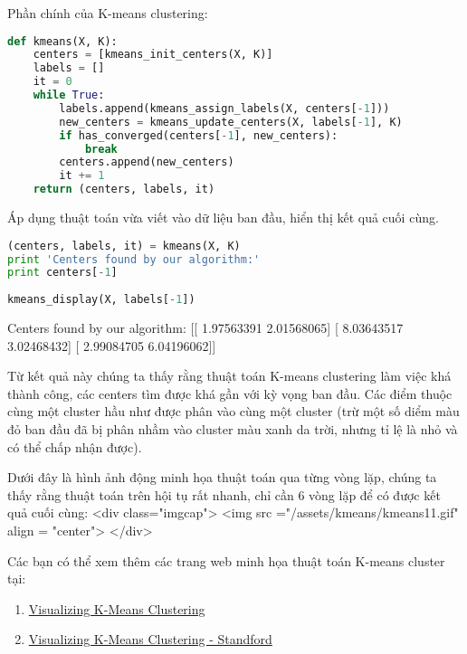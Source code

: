 Phần chính của K-means clustering: 
 
 
\begin{lstlisting}[language=Python]
def kmeans(X, K): 
    centers = [kmeans_init_centers(X, K)] 
    labels = [] 
    it = 0  
    while True: 
        labels.append(kmeans_assign_labels(X, centers[-1])) 
        new_centers = kmeans_update_centers(X, labels[-1], K) 
        if has_converged(centers[-1], new_centers): 
            break 
        centers.append(new_centers) 
        it += 1 
    return (centers, labels, it) 
\end{lstlisting}
 
Áp dụng thuật toán vừa viết vào dữ liệu ban đầu, hiển thị kết quả cuối cùng.  
 
 
\begin{lstlisting}[language=Python]
(centers, labels, it) = kmeans(X, K) 
print 'Centers found by our algorithm:' 
print centers[-1] 
 
kmeans_display(X, labels[-1]) 
\end{lstlisting}
 
    Centers found by our algorithm: 
    [[ 1.97563391  2.01568065] 
     [ 8.03643517  3.02468432] 
     [ 2.99084705  6.04196062]] 
 
 
 
 
Từ kết quả này chúng ta thấy rằng thuật toán K-means clustering làm việc khá thành công, các centers tìm được khá gần với kỳ vọng ban đầu. Các điểm thuộc cùng một cluster hầu như được phân vào cùng một cluster (trừ một số diểm màu đỏ ban đầu đã bị phân nhầm vào cluster màu xanh da trời, nhưng tỉ lệ là nhỏ và có thể chấp nhận được). 
 
Dưới đây là hình ảnh động minh họa thuật toán qua từng vòng lặp, chúng ta thấy rằng thuật toán trên hội tụ rất nhanh, chỉ cần 6 vòng lặp để có được kết quả cuối cùng: 
<div class="imgcap"> 
<img src ="/assets/kmeans/kmeans11.gif" align = "center"> 
</div> 
 
 
Các bạn có thể xem thêm các trang web minh họa thuật toán K-means cluster tại: 
\begin{enumerate}
	\item \href{https://www.naftaliharris.com/blog/visualizing-k-means-clustering/}{Visualizing K-Means Clustering}

	\item \href{http://stanford.edu/class/ee103/visualizations/kmeans/kmeans.html}{Visualizing K-Means Clustering - Standford}
 
\end{enumerate}
 
